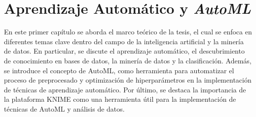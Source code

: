 \chapter{Aprendizaje Automático y \textit{AutoML}}\label{chap:1}

En este primer capítulo se aborda el marco teórico de la tesis, el cual se enfoca en diferentes temas clave dentro del campo de la inteligencia artificial y la minería de datos. En particular, se discute el aprendizaje automático, el descubrimiento de conocimiento en bases de datos, la minería de datos y la clasificación. Además, se introduce el concepto de AutoML, como herramienta para automatizar el proceso de preprocesado y optimización de hiperparámetros en la implementación de técnicas de aprendizaje automático. Por último, se destaca la importancia de la plataforma KNIME como una herramienta útil para la implementación de técnicas de AutoML y análisis de datos.

